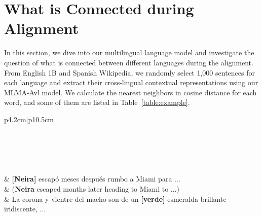\documentclass[11pt,a4paper]{article}
\begin{document}
	\section{What is Connected during Alignment}
	In this section, we dive into our multilingual language model and investigate the question of what is connected between different languages during the alignment. From English 1B and Spanish Wikipedia, we randomly select 1,000 sentences for each language and extract their cross-lingual contextual representations using our MLMA-Avl model. We calculate the nearest neighbors in cosine distance for each word, and some of them are listed in Table~\ref{table:example}.
	\begin{table}[th]
		\small
		\centering
		\begin{tabular}{p{4.2cm}|p{10.5cm}} 
			\hline
			 \\
			\hline \hline
			 \\ %
			 \\ %
			\hline \hline
			\\	\\
			\hline
			 \\
			\hline \hline
			 & \textbf{[Neira]} escapó meses después rumbo a Miami para ... \\
			& (\textbf{Neira} escaped months later heading to Miami to ...) \\ \hline
			 & La corona y vientre del macho son de un \textbf{[verde]} esmeralda brillante iridiscente, ...\\

\end{tabular}
\end{table}
\end{document}
